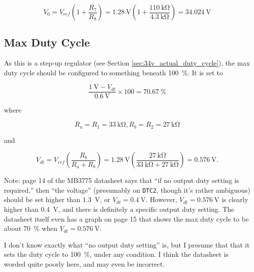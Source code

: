 \documentclass{article}
\newcommand{\chippin}{\texttt}
\newcommand{\model}{\textsf}
\begin{document}
\begin{displaymath}
  V_0 = V_{ref}\left(1+\frac{R_7}{R_8}\right) =
  \qty{1.28}{\volt}\left(1+\frac{\qty{110}{\kilo\ohm}}{\qty{4.3}{\kilo\ohm}}\right)
  = \qty{34.024}{\volt}
\end{displaymath}

\subsection{Max Duty Cycle}
As this is a step-up regulator (see Section
\ref{sec:34v_actual_duty_cycle}), the max duty cycle should be
configured to something beneath \qty{100}{\%}. It is set to

\begin{displaymath}
  \frac{\qty{1}{\volt} - V_{dt}}{\qty{0.6}{\volt}} \times{} 100 = \qty{70.67}{\%}
\end{displaymath}

\noindent
where

\begin{displaymath}
  R_a = R_1 = \qty{33}{\kilo\ohm},R_b = R_2 = \qty{27}{\kilo\ohm}
\end{displaymath}

\noindent
and

\begin{displaymath}
  V_{dt} =  V_{ref}\left(\frac{R_b}{R_a+R_b}\right) =
  \qty{1.28}{\volt}\left(\frac{\qty{27}{\kilo\ohm}}{\qty{33}{\kilo\ohm} +
      \qty{27}{\kilo\ohm}}\right) = \qty{0.576}{\volt}.
\end{displaymath}

Note: page 14 of the \model{MB3775} datasheet says that ``if no output
duty setting is required,'' then ``the voltage'' (presumably on
\chippin{DTC2}, though it's rather ambiguous) should be set higher
than \qty{1.3}{\volt}, or $V_{dt} = \qty{0.4}{\volt}$. However,
$V_{dt} = \qty{0.576}{\volt}$ is clearly higher than \qty{0.4}{\volt},
and there is definitely a specific output duty setting. The datasheet
itself even has a graph on page 15 that shows the max duty cycle to be
about \qty{70}{\%} when $V_{dt} = \qty{0.576}{\volt}$.

I don't know exactly what ``no output duty setting'' is, but I presume
that that it sets the duty cycle to \qty{100}{\%}, under any
condition. I think the datasheet is worded quite poorly here, and may
even be incorrect.
\end{document}
